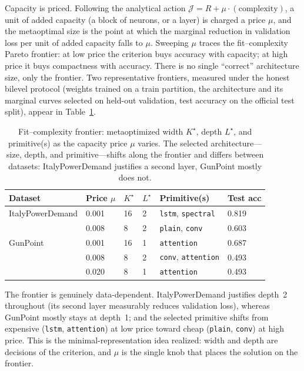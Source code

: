 \documentclass[11pt]{article}
\newcommand{\allowbreakhere}{\discretionary{}{}{}}
\newcommand{\code}[1]{\texttt{\def\_{\char`_\allowbreakhere}#1}}
\begin{document}
Capacity is priced. Following the analytical action $\mathcal{J}=R+\mu\cdot(\text{complexity})$,
a unit of added capacity (a block of neurons, or a layer) is charged a price $\mu$, and the
metaoptimal size is the point at which the marginal reduction in validation loss per unit of
added capacity falls to $\mu$. Sweeping $\mu$ traces the fit--complexity Pareto frontier: at
low price the criterion buys accuracy with capacity; at high price it buys compactness with
accuracy. There is no single ``correct'' architecture size, only the frontier. Two representative
frontiers, measured under the honest bilevel protocol (weights trained on a train partition, the
architecture and its marginal curves selected on held-out validation, test accuracy on the
official test split), appear in Table~\ref{tab:frontier}.

\begin{table}[h]
\centering
\small
\renewcommand{\arraystretch}{1.2}
\begin{tabular}{p{2.9cm} p{1.4cm} p{1.1cm} p{1.1cm} p{3.1cm} p{1.6cm}}
\toprule
\textbf{Dataset} & \textbf{Price $\mu$} & \textbf{$K^\star$} & \textbf{$L^\star$} & \textbf{Primitive(s)} & \textbf{Test acc}\\
\midrule
ItalyPowerDemand & 0.001 & 16 & 2 & \code{lstm}, \code{spectral} & 0.819\\
                 & 0.008 & 8  & 2 & \code{plain}, \code{conv}     & 0.603\\
GunPoint         & 0.001 & 16 & 1 & \code{attention}              & 0.687\\
                 & 0.008 & 8  & 2 & \code{conv}, \code{attention} & 0.493\\
                 & 0.020 & 8  & 1 & \code{attention}              & 0.493\\
\bottomrule
\end{tabular}
\caption{Fit--complexity frontier: metaoptimized width $K^\star$, depth $L^\star$, and
primitive(s) as the capacity price $\mu$ varies. The selected architecture---size, depth, and
primitive---shifts along the frontier and differs between datasets: ItalyPowerDemand justifies
a second layer, GunPoint mostly does not.}
\label{tab:frontier}
\end{table}

The frontier is genuinely data-dependent. ItalyPowerDemand justifies depth~2 throughout (its
second layer measurably reduces validation loss), whereas GunPoint mostly stays at depth~1; and
the selected primitive shifts from expensive (\code{lstm}, \code{attention}) at low price toward
cheap (\code{plain}, \code{conv}) at high price. This is the minimal-representation idea realized:
width and depth are decisions of the criterion, and $\mu$ is the single knob that places the
solution on the frontier.
\end{document}
